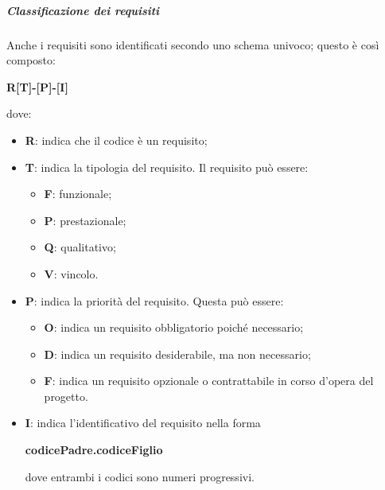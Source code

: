 \documentclass[../norme-di-progetto.tex]{subfiles}
\begin{document}
\subparagraph{Classificazione dei requisiti}
Anche i requisiti sono identificati secondo uno schema univoco; questo è così composto: \\
\begin{center}
  \centering
  \textbf{R[T]-[P]-[I]}
\end{center} dove:
\begin{itemize}
  \item \textbf{R}: indica che il codice è un requisito;
  \item \textbf{T}: indica la tipologia del requisito. Il requisito può essere:
  \begin{itemize}
    \item \textbf{F}: funzionale;
    \item \textbf{P}: prestazionale;
    \item \textbf{Q}: qualitativo;
    \item \textbf{V}: vincolo.
  \end{itemize}
  \item \textbf{P}: indica la priorità del requisito. Questa può essere:
  \begin{itemize}
    \item \textbf{O}: indica un requisito obbligatorio poiché necessario;
    \item \textbf{D}: indica un requisito desiderabile, ma non necessario;
    \item \textbf{F}: indica un requisito opzionale o contrattabile in corso d'opera del progetto.
  \end{itemize}
  \item \textbf{I}: indica l'identificativo del requisito nella forma \\
  \begin{center}
    \centering
    \textbf{codicePadre.codiceFiglio}
  \end{center} dove entrambi i codici sono numeri progressivi.
\end{itemize}
\end{document}
